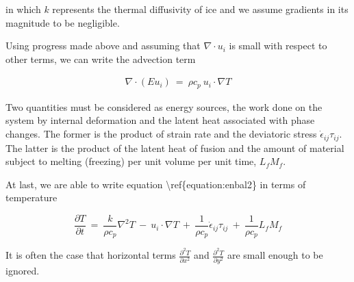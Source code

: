 in which $k$ represents the thermal diffusivity of ice and we assume
gradients in its magnitude to be negligible.

Using progress made above and assuming that $\nabla \cdot u_{i}$ is
small with respect to other terms, we can write the advection term

\begin{equation}
\begin{matrix}
\nabla \cdot \left(E u_{i} \right)~=~\rho c_{p}~ u_{i} \cdot \nabla T  
\end{matrix}
\end{equation}

Two quantities must be considered as energy sources, the work done on
the system by internal deformation and the latent heat associated with
phase changes. The former is the product of strain rate and the
deviatoric stress $\dot{\epsilon}_{ij} \tau_{ij}$. The latter is the
product of the latent heat of fusion and the amount of material subject
to melting (freezing) per unit volume per unit time, $L_{f}M_{f}$.

At last, we are able to write equation
\textbackslash{}ref\{equation:enbal2\} in terms of temperature

\begin{equation}
\frac{\partial T}{\partial t}~=~\frac{k}{\rho c_{p}} \nabla^{2}T~-~u_{i}\cdot \nabla T~+~\frac{1}{\rho c_{p}} \dot{\epsilon}_{ij} \tau_{ij} ~+~\frac{1}{\rho c_{p}} L_{f} M_{f}
\end{equation}

It is often the case that horizontal terms
$\frac{\partial^{2} T}{\partial x^{2}}$ and
$\frac{\partial^{2} T}{\partial y^{2}}$ are small enough to be ignored.

